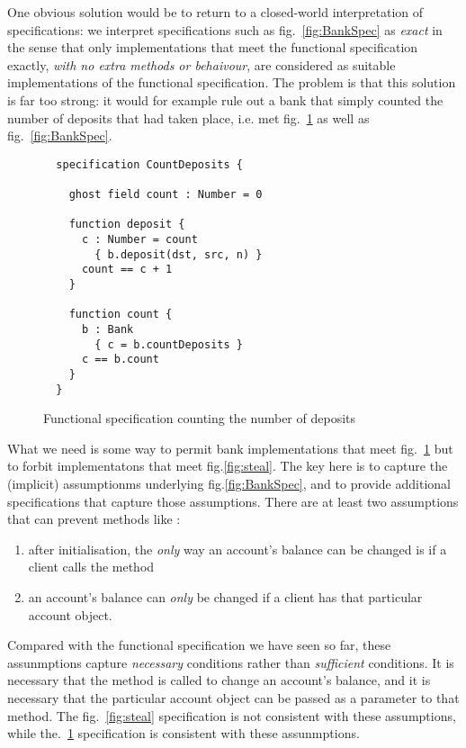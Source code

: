One obvious solution would be to return to a closed-world
interpretation of specifications: we interpret specifications such as
fig.~\ref{fig:BankSpec} as \emph{exact} in the sense that only
implementations that meet the functional specification exactly,
\emph{with no extra methods or behaivour}, are considered as suitable
implementations of the functional specification. The problem is that
this solution is far too strong: it would for example rule out a bank
that simply counted the number of deposits that had taken place,
i.e. met fig.~\ref{fig:count} as well as fig.~\ref{fig:BankSpec}.


\begin{figure}[tbp]
\begin{lstlisting}
  specification CountDeposits {

    ghost field count : Number = 0

    function deposit {
      c : Number = count
        { b.deposit(dst, src, n) }
      count == c + 1
    }

    function count {
      b : Bank
        { c = b.countDeposits }
      c == b.count
    }
  }
\end{lstlisting}
\caption{Functional specification counting the number of deposits}
\label{fig:count}
\end{figure}


What we need is some way to permit bank implementations that meet
fig.~\ref{fig:count} but to forbit implementatons that meet
fig.\ref{fig:steal}.  The key here is to capture the (implicit)
assumptionms underlying fig.\ref{fig:BankSpec}, and to provide
additional specifications that capture those assumptions.  There are
at least two assumptions that can prevent methods like :

\begin{enumerate}
\item after initialisation, the \emph{only} way an account's
  balance can be changed is if a client calls the  method
\item an account's balance can \emph{only} be changed if a client has
  that particular account object.
\end{enumerate}

Compared with the functional specification we have seen so far, these
assunmptions capture \emph{necessary} conditions rather than
\emph{sufficient} conditions. It is necessary that the 
method is called to change an account's balance, and it is necessary
that the particular account object can be passed as a parameter to
that method. The fig.~\ref{fig:steal} specification is not consistent
with these assumptions, while the.~\ref{fig:count} specification is
consistent with these assunmptions.


